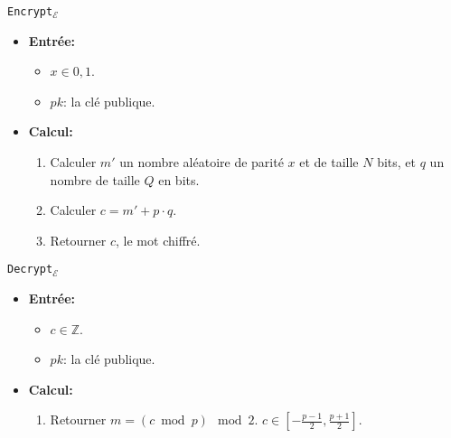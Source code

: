 	\begin{algo}{\verb!Encrypt!$_\mathcal{E}$}
		\begin{itemize}\renewcommand{\labelitemi}{} \renewcommand{\labelitemii}{$\cdot$}
			\item{\bf Entrée:} 
				\begin{itemize}
					\item $x\in{0,1}$.
					\item $pk$: la clé publique.
				\end{itemize}
			\item{\bf Calcul:}
				\begin{enumerate} %
				\renewcommand{\theenumi}{\arabic{enumi}}
				\renewcommand{\theenumii}{\arabic{enumii}}
				\renewcommand{\theenumiii}{\arabic{enumiii}}
				\renewcommand{\labelenumi}{\theenumi.}
				\renewcommand{\labelenumii}{\theenumi.\theenumii.}
				\renewcommand{\labelenumiii}{\theenumi.\theenumii.\theenumiii.}
				\makeatletter
				\renewcommand{\p@enumii}{\theenumi.}
				\renewcommand{\p@enumiii}{\theenumi.\theenumii.}
				\makeatother
					\item Calculer $m'$ un nombre aléatoire de parité $x$ et de taille $N$ bits, et $q$ un nombre de taille $Q$ en bits.
					\item Calculer $c = m'+p\cdot q$.
					\item Retourner $c$, le mot chiffré. 
				\end{enumerate}
			\end{itemize}
	\end{algo}

	\begin{algo}{\verb!Decrypt!$_\mathcal{E}$}
		\begin{itemize}\renewcommand{\labelitemi}{} \renewcommand{\labelitemii}{$\cdot$}
			\item{\bf Entrée:} 
				\begin{itemize}
					\item $c\in \mathbb{Z}$.
					\item $pk$: la clé publique.
				\end{itemize}
			\item{\bf Calcul:}
				\begin{enumerate} %
				\renewcommand{\theenumi}{\arabic{enumi}}
				\renewcommand{\theenumii}{\arabic{enumii}}
				\renewcommand{\theenumiii}{\arabic{enumiii}}
				\renewcommand{\labelenumi}{\theenumi.}
				\renewcommand{\labelenumii}{\theenumi.\theenumii.}
				\renewcommand{\labelenumiii}{\theenumi.\theenumii.\theenumiii.}
				\makeatletter
				\renewcommand{\p@enumii}{\theenumi.}
				\renewcommand{\p@enumiii}{\theenumi.\theenumii.}
				\makeatother
					\item Retourner $m = (c\bmod{p})\mod{2}$. $c\in [-\frac{p-1}{2},\frac{p+1}{2}]$. 
				\end{enumerate}
		\end{itemize}
	\end{algo}


